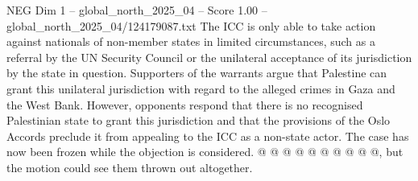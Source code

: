 \begin{textsample}{NEG Dim 1 – global\_north\_2025\_04 – Score 1.00 – global\_north\_2025\_04/124179087.txt}
The ICC is only able to take action against nationals of non-member states in limited circumstances, such as a referral by the UN Security Council or the unilateral acceptance of its jurisdiction by the state in question.
Supporters of the warrants argue that Palestine can grant this unilateral jurisdiction with regard to the alleged crimes in Gaza and the West Bank.
However, opponents respond that there is no recognised Palestinian state to grant this jurisdiction and that the provisions of the Oslo Accords preclude it from appealing to the ICC as a non-state actor.
The case has now been frozen while the objection is considered. @ @ @ @ @ @ @ @ @ @, but the motion could see them thrown out altogether.

\end{textsample}
